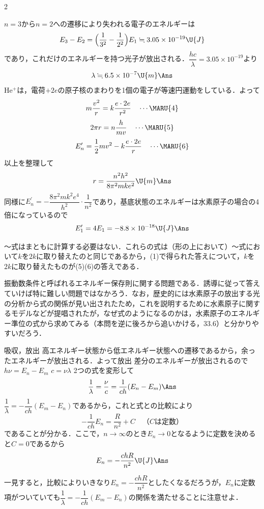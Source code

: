 \begin{multicols}{2}
\begin{komon}
\begin{bekkai}
       \end{bekkai}
 $n=3$から$n=2$への遷移により失われる電子のエネルギーは
       \[E_3-E_2=\Bigl(\frac{1}{3^2}-\frac{1}{2^2}\Bigr)E_1\fallingdotseq 3.05\times 10^{-19}\U{J}\]
       であり，これだけのエネルギーを持つ光子が放出される．$\dfrac{hc}{\lambda}=3.05\times 10^{-19}$より
       \[\lambda\fallingdotseq 6.5\times 10^{-7}\U{m}\Ans\]
 $\mathrm{He^+}$は，電荷$+2e$の原子核のまわりを1個の電子が等速円運動をしている．よって
       \[m\frac{v^2}{r}=k\frac{e\cdot 2e}{r^2}\quad\cdots\text{\MARU{4}}\]
       \[2\pi r=n\frac{h}{mv}\quad\cdots\text{\MARU{5}}\]
       \[E_n^\prime=\frac{1}{2}mv^2-k\frac{e\cdot 2e}{r}\quad\cdots\text{\MARU{6}}\]
       以上を整理して
       \[r=\frac{n^2h^2}{8\pi^2mke^2}\U{m}\Ans\]
 同様に$E_n^\prime=-\dfrac{8\pi^2mk^2e^4}{h^2}\cdot\dfrac{1}{n^2}$であり，基底状態のエネルギーは水素原子の場合の4倍になっているので
       \[E_1^\prime=4E_1=-8.8\times 10^{-18}\U{J}\Ans\]
       \begin{chuu}
       〜式はまともに計算する必要はない．これらの式は（形の上において）〜式において$k$を$2k$に取り替えたのと同じであるから，(1)で得られた答えについて，$k$を$2k$に取り替えたものが(5)(6)の答えである．
       \end{chuu}
\end{komon}

\par\nopagebreak
\begin{sisin}
振動数条件と呼ばれるエネルギー保存則に関する問題である．誘導に従って答えていけば特に難しい問題ではなかろう．なお，歴史的には水素原子の放出する光の分析から式の関係が見い出されたため，これを説明するために水素原子に関するモデルなどが提唱されたが，なぜ式のようになるのかは，水素原子のエネルギー準位の式から求めてみる（本問を逆に後ろから追いかける，33.6）と分かりやすいだろう．
\end{sisin}
\KaiHead
\begin{komon}
\item[{\makebox[1.9zw][r]{(1)(2)}}] 吸収，放出\Ans
{} 高エネルギー状態から低エネルギー状態への遷移であるから，余ったエネルギーが放出される．よって\quad 放出\Ans
{} 差分のエネルギーが放出されるので\quad $h\nu=E_n-E_m$\Ans
{} $c=\nu\lambda$\Ans
{} 2つの式を変形して
       \[\frac{1}{\lambda}=\frac{\nu}{c}=\frac{1}{ch}(E_n-E_m)\Ans\]
 $\dfrac{1}{\lambda}=-\dfrac{1}{ch}(E_m-E_n)$であるから，これと式との比較により
       \[-\frac{1}{ch}E_n=\frac{R}{n^2}+C\quad\text{（$C$は定数）}\]
       であることが分かる．ここで，$n\to\infty$のとき$E_n\to 0$となるように定数を決めると$C=0$であるから
       \[E_n=-\frac{chR}{n^2}\U{J}\Ans\]
       \begin{chuu}
       一見すると，比較によりいきなり$E_n=-\dfrac{chR}{n^2}$としたくなるだろうが，$E_n$に定数項がついていても$\dfrac{1}{\lambda}=-\dfrac{1}{ch}(E_m-E_n)$の関係を満たせることに注意せよ．
       \end{chuu}
\end{komon}


\end{multicols}

